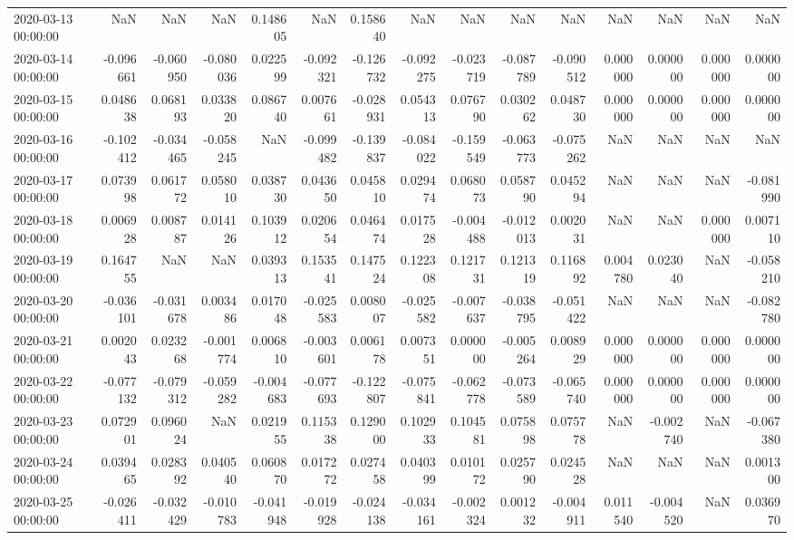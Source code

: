 \begin{tabular}{lrrrrrrrrrrrrrr}
2020-03-13 00:00:00 & NaN & NaN & NaN & 0.148605 & NaN & 0.158640 & NaN & NaN & NaN & NaN & NaN & NaN & NaN & NaN \\
2020-03-14 00:00:00 & -0.096661 & -0.060950 & -0.080036 & 0.022599 & -0.092321 & -0.126732 & -0.092275 & -0.023719 & -0.087789 & -0.090512 & 0.000000 & 0.000000 & 0.000000 & 0.000000 \\
2020-03-15 00:00:00 & 0.048638 & 0.068193 & 0.033820 & 0.086740 & 0.007661 & -0.028931 & 0.054313 & 0.076790 & 0.030262 & 0.048730 & 0.000000 & 0.000000 & 0.000000 & 0.000000 \\
2020-03-16 00:00:00 & -0.102412 & -0.034465 & -0.058245 & NaN & -0.099482 & -0.139837 & -0.084022 & -0.159549 & -0.063773 & -0.075262 & NaN & NaN & NaN & NaN \\
2020-03-17 00:00:00 & 0.073998 & 0.061772 & 0.058010 & 0.038730 & 0.043650 & 0.045810 & 0.029474 & 0.068073 & 0.058790 & 0.045294 & NaN & NaN & NaN & -0.081990 \\
2020-03-18 00:00:00 & 0.006928 & 0.008787 & 0.014126 & 0.103912 & 0.020654 & 0.046474 & 0.017528 & -0.004488 & -0.012013 & 0.002031 & NaN & NaN & 0.000000 & 0.007110 \\
2020-03-19 00:00:00 & 0.164755 & NaN & NaN & 0.039313 & 0.153541 & 0.147524 & 0.122308 & 0.121731 & 0.121319 & 0.116892 & 0.004780 & 0.023040 & NaN & -0.058210 \\
2020-03-20 00:00:00 & -0.036101 & -0.031678 & 0.003486 & 0.017048 & -0.025583 & 0.008007 & -0.025582 & -0.007637 & -0.038795 & -0.051422 & NaN & NaN & NaN & -0.082780 \\
2020-03-21 00:00:00 & 0.002043 & 0.023268 & -0.001774 & 0.006810 & -0.003601 & 0.006178 & 0.007351 & 0.000000 & -0.005264 & 0.008929 & 0.000000 & 0.000000 & 0.000000 & 0.000000 \\
2020-03-22 00:00:00 & -0.077132 & -0.079312 & -0.059282 & -0.004683 & -0.077693 & -0.122807 & -0.075841 & -0.062778 & -0.073589 & -0.065740 & 0.000000 & 0.000000 & 0.000000 & 0.000000 \\
2020-03-23 00:00:00 & 0.072901 & 0.096024 & NaN & 0.021955 & 0.115338 & 0.129000 & 0.102933 & 0.104581 & 0.075898 & 0.075778 & NaN & -0.002740 & NaN & -0.067380 \\
2020-03-24 00:00:00 & 0.039465 & 0.028392 & 0.040540 & 0.060870 & 0.017272 & 0.027458 & 0.040399 & 0.010172 & 0.025790 & 0.024528 & NaN & NaN & NaN & 0.001300 \\
2020-03-25 00:00:00 & -0.026411 & -0.032429 & -0.010783 & -0.041948 & -0.019928 & -0.024138 & -0.034161 & -0.002324 & 0.001232 & -0.004911 & 0.011540 & -0.004520 & NaN & 0.036970 \\

\end{tabular}
